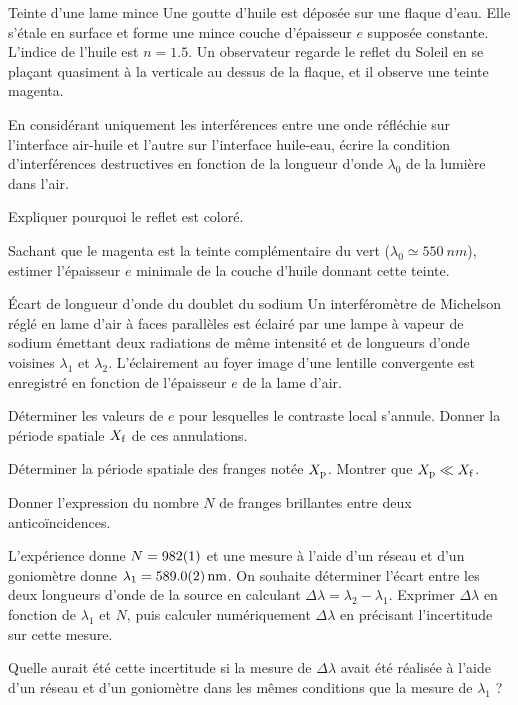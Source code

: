 
\begin{exo}[PC]{Teinte d'une lame mince}
Une goutte d'huile est déposée sur une flaque d'eau. Elle s'étale en surface et forme une mince couche d'épaisseur $e$ supposée constante. L'indice de l'huile est $n=1.5$. Un observateur regarde le reflet du Soleil en se plaçant quasiment à la verticale au dessus de la flaque, et il observe une teinte magenta.
\begin{quest}
\item En considérant uniquement les interférences entre une onde réfléchie sur l'interface air-huile et l'autre sur l'interface huile-eau, écrire la condition d'interférences destructives en fonction de la longueur d'onde $\lambda_0$ de la lumière dans l'air.
\item Expliquer pourquoi le reflet est coloré.
\item Sachant que le magenta est la teinte complémentaire du vert ($\lambda_0\simeq\SI{550}{nm}$), estimer l'épaisseur $e$ minimale de la couche d'huile donnant cette teinte.
\end{quest}
\end{exo}

\begin{exo}[PC]{Écart de longueur d'onde du doublet du sodium}
Un interféromètre de Michelson réglé en lame d'air à faces parallèles est éclairé par une lampe à vapeur de sodium émettant deux radiations de même intensité et de longueurs d'onde voisines $\lambda_1$ et $\lambda_2$. L'éclairement au foyer image d'une lentille convergente est enregistré en fonction de l'épaisseur $e$ de la lame d'air.
\begin{quest}
\item Déterminer les valeurs de $e$ pour lesquelles le contraste local s'annule. Donner la période spatiale $X_{\rm{f}}$ de ces annulations.
\item Déterminer la période spatiale des franges notée $X_{\rm{p}}$. Montrer que $X_{\rm{p}}\ll X_{\rm{f}}$.
\item Donner l'expression du nombre $N$ de franges brillantes entre deux anticoïncidences.
\item L'expérience donne $N=\SI{982\pm 1}{}$ et une mesure à l'aide d'un réseau et d'un goniomètre donne $\lambda_1=\SI{589.0\pm 0.2}{nm}$. On souhaite déterminer l'écart entre les deux longueurs d'onde de la source en calculant $\Delta\lambda=\lambda_2-\lambda_1$. Exprimer $\Delta\lambda$ en fonction de $\lambda_1$ et $N$, puis calculer numériquement $\Delta\lambda$ en précisant l'incertitude sur cette mesure.
\item Quelle aurait été cette incertitude si la mesure de $\Delta \lambda$ avait été réalisée à l'aide d'un réseau et d'un goniomètre dans les mêmes conditions que la mesure de $\lambda_1$ ?
\end{quest}
\end{exo}

